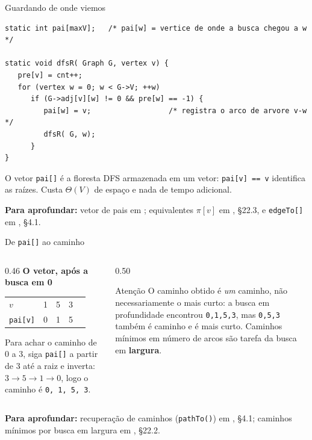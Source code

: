 \documentclass[aspectratio=169]{beamer}
\newcommand{\fonte}[1]{%
  \vfill
  {\tiny\color{gray!55!black}\textbf{Para aprofundar:} #1\par}%
}
\begin{document}
\begin{frame}[fragile]{Guardando de onde viemos}
\begin{lstlisting}
static int pai[maxV];   /* pai[w] = vertice de onde a busca chegou a w */

static void dfsR( Graph G, vertex v) {
   pre[v] = cnt++;
   for (vertex w = 0; w < G->V; ++w)
      if (G->adj[v][w] != 0 && pre[w] == -1) {
         pai[w] = v;                  /* registra o arco de arvore v-w */
         dfsR( G, w);
      }
}
\end{lstlisting}
  {\scriptsize O vetor \texttt{pai[]} é a floresta DFS armazenada em um vetor:
  \texttt{pai[v] == v} identifica as raízes. Custa $\Theta(V)$ de espaço e nada
  de tempo adicional.}
  \fonte{vetor de pais em \cite{feofiloff2020algoritmos}; equivalentes
  $\pi[v]$ em \cite{cormen2009introduction}, §22.3, e \texttt{edgeTo[]} em
  \cite{sedgewick2011algorithms}, §4.1.}
\end{frame}

\begin{frame}{De \texttt{pai[]} ao caminho}
  \begin{columns}[T]
    \begin{column}{0.46\textwidth}
      {\small \textbf{O vetor, após a busca em 0}}
      \begin{center}\scriptsize
      \begin{tabular}{lcccc}
        \toprule
        $v$        & 1 & 5 & 3 \\
        \texttt{pai[v]} & 0 & 1 & 5 \\
        \bottomrule
      \end{tabular}
      \end{center}
      \medskip
      {\scriptsize Para achar o caminho de 0 a 3, siga \texttt{pai[]} a partir de
      3 até a raiz e inverta: $3 \to 5 \to 1 \to 0$, logo o caminho é
      \texttt{0, 1, 5, 3}.}
    \end{column}
    \begin{column}{0.50\textwidth}
      \begin{block}{Atenção}
        {\scriptsize O caminho obtido é \emph{um} caminho, não necessariamente o
        mais curto: a busca em profundidade encontrou \texttt{0,1,5,3}, mas
        \texttt{0,5,3} também é caminho e é mais curto. Caminhos mínimos em
        número de arcos são tarefa da busca em \textbf{largura}.}
      \end{block}
    \end{column}
  \end{columns}
  \fonte{recuperação de caminhos (\texttt{pathTo()}) em
  \cite{sedgewick2011algorithms}, §4.1; caminhos mínimos por busca em largura
  em \cite{cormen2009introduction}, §22.2.}
\end{frame}
\end{document}
